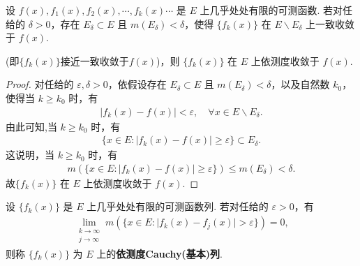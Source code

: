 \documentclass[../../main.tex]{subfiles}
\begin{document}
\begin{theorem}\label{theorem:定理3.15}
设 $f(x),f_1(x),f_2(x),\cdots,f_k(x)\cdots$ 是 $E$ 上几乎处处有限的可测函数. 若对任给的 $\delta>0$，存在 $E_\delta\subset E$ 且 $m(E_\delta)<\delta$，使得 $\{f_k(x)\}$ 在 $E\backslash E_\delta$ 上一致收敛于 $f(x)$.

(即$\{f_k(x)\}$接近一致收敛于$f(x)$)，则 $\{f_k(x)\}$ 在 $E$ 上依测度收敛于 $f(x)$.
\end{theorem}
\begin{proof}
对任给的 $\varepsilon,\delta>0$，依假设存在 $E_\delta\subset E$ 且 $m(E_\delta)<\delta$，以及自然数 $k_0$，使得当 $k\geqslant k_0$ 时，有
\begin{align*}
\vert f_k(x)-f(x)\vert<\varepsilon,\quad \forall x\in E\backslash E_\delta.
\end{align*}
由此可知,当 $k\geqslant k_0$ 时，有
\begin{align*}
\{x\in E:\vert f_k(x)-f(x)\vert\geqslant\varepsilon\}\subset E_\delta.
\end{align*}
这说明，当 $k\geqslant k_0$ 时，有
\begin{align*}
m(\{x\in E:\vert f_k(x)-f(x)\vert\geqslant\varepsilon\})\leqslant m(E_\delta)<\delta.
\end{align*}
故$\{f_k(x)\}$ 在 $E$ 上依测度收敛于 $f(x)$.
\end{proof}

\begin{definition}[依测度Cauchy(基本)列]
设 $\{f_k(x)\}$ 是 $E$ 上几乎处处有限的可测函数列. 若对任给的 $\varepsilon>0$，有
\begin{align*}
\lim_{\substack{k\to\infty\\j\to\infty}}m(\{x\in E:\vert f_k(x)-f_j(x)\vert>\varepsilon\}) = 0,
\end{align*}
则称 $\{f_k(x)\}$ 为 $E$ 上的\textbf{依测度Cauchy(基本)列}.
\end{definition}
\end{document}
